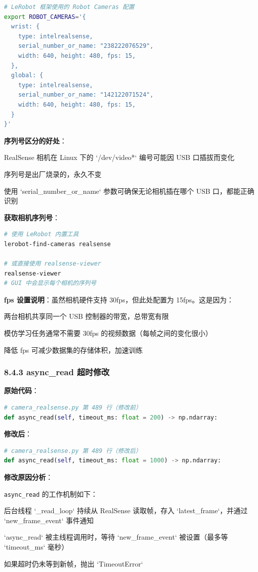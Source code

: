\documentclass[UTF8,a4paper,11pt]{ctexart}
\begin{document}
{\begin{lstlisting}[language=bash]
# LeRobot 框架使用的 Robot Cameras 配置
export ROBOT_CAMERAS='{
  wrist: {
    type: intelrealsense,
    serial_number_or_name: "238222076529",
    width: 640, height: 480, fps: 15,
  },
  global: {
    type: intelrealsense,
    serial_number_or_name: "142122071524",
    width: 640, height: 480, fps: 15,
  }
}'
\end{lstlisting}

\textbf{序列号区分的好处}：
\item RealSense 相机在 Linux 下的 `/dev/video*` 编号可能因 USB 口插拔而变化
\item 序列号是出厂烧录的，永久不变
\item 使用 `serial_number_or_name` 参数可确保无论相机插在哪个 USB 口，都能正确识别

\textbf{获取相机序列号}：
\begin{lstlisting}[language=bash]
# 使用 LeRobot 内置工具
lerobot-find-cameras realsense

# 或直接使用 realsense-viewer
realsense-viewer
# GUI 中会显示每个相机的序列号
\end{lstlisting}

\textbf{fps 设置说明}：虽然相机硬件支持 30fps，但此处配置为 15fps。这是因为：
\item[1] 两台相机共享同一个 USB 控制器的带宽，总带宽有限
\item[2] 模仿学习任务通常不需要 30fps 的视频数据（每帧之间的变化很小）
\item[3] 降低 fps 可减少数据集的存储体积，加速训练

\subsubsection{8.4.3 async_read 超时修改}

\textbf{原始代码}：
\begin{lstlisting}[language=python]
# camera_realsense.py 第 489 行（修改前）
def async_read(self, timeout_ms: float = 200) -> np.ndarray:
\end{lstlisting}

\textbf{修改后}：
\begin{lstlisting}[language=python]
# camera_realsense.py 第 489 行（修改后）
def async_read(self, timeout_ms: float = 1000) -> np.ndarray:
\end{lstlisting}

\textbf{修改原因分析}：

\texttt{async_read} 的工作机制如下：
\item[1] 后台线程 `_read_loop` 持续从 RealSense 读取帧，存入 `latest_frame`，并通过 `new_frame_event` 事件通知
\item[2] `async_read` 被主线程调用时，等待 `new_frame_event` 被设置（最多等 `timeout_ms` 毫秒）
\item[3] 如果超时仍未等到新帧，抛出 `TimeoutError`

}
\end{document}
